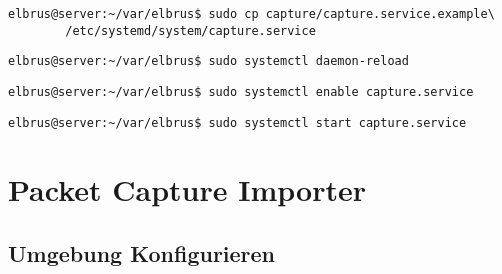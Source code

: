 \documentclass{article}
\begin{document}
	\lstset{style=commands}
	\begin{lstlisting}[caption={Kopieren des Serviceprogrammes.}]
		elbrus@server:~/var/elbrus$ sudo cp capture/capture.service.example\
		/etc/systemd/system/capture.service
	\end{lstlisting}

	\begin{lstlisting}[caption={Neuladen des 'systemctl' Deamons.}]
		elbrus@server:~/var/elbrus$ sudo systemctl daemon-reload
	\end{lstlisting}
	
	\begin{lstlisting}[caption={Aktivieren des Serviceprogrammes.}]
		elbrus@server:~/var/elbrus$ sudo systemctl enable capture.service
	\end{lstlisting}

	\begin{lstlisting}[caption={Starten des Serviceprogrammes.}]
		elbrus@server:~/var/elbrus$ sudo systemctl start capture.service
	\end{lstlisting}
	
	\newpage
	
	
	\section{Packet Capture Importer}

	\subsection[file config]{Umgebung Konfigurieren}
\end{document}
